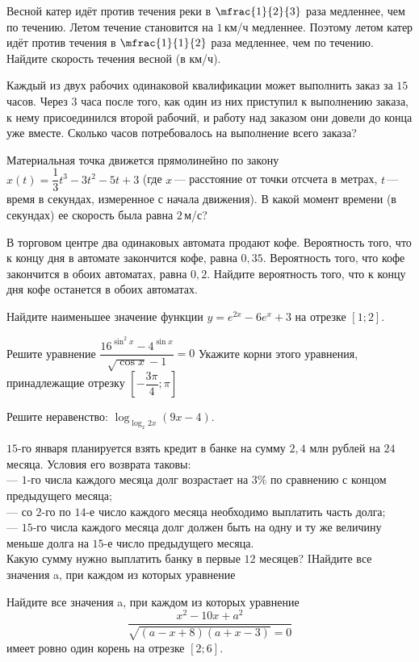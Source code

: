 \begin{class}[number=3]
	\begin{listofex}
		\item Весной катер идёт против течения реки в \(\mfrac{1 }{2 }{ 3}\) раза медленнее, чем по течению. Летом течение становится на \(1\) км/ч медленнее. Поэтому летом катер идёт против течения в \(\mfrac{1 }{1 }{2 }\) раза медленнее, чем по течению. Найдите скорость течения весной (в км/ч).
		\item Каждый из двух рабочих одинаковой квалификации может выполнить заказ за \(15\) часов. Через \(3\) часа после того, как один из них приступил к выполнению заказа, к нему присоединился второй рабочий, и работу над заказом они довели до конца уже вместе. Сколько часов потребовалось на выполнение всего заказа?
		\item Материальная точка движется прямолинейно по закону \(x(t)=\dfrac{ 1 }{ 3 }t^3-3t^2-5t+3\) (где \(x\) --- расстояние от точки отсчета в метрах, \(t\) --- время в секундах, измеренное с начала движения). В какой момент времени (в секундах) ее скорость была равна \(2\) м/с?
		\item В торговом центре два одинаковых автомата продают кофе. Вероятность того, что к концу дня в автомате закончится кофе, равна \(0,35\). Вероятность того, что кофе закончится в обоих автоматах, равна \(0,2\). Найдите вероятность того, что к концу дня кофе останется в обоих автоматах.
		\item Найдите наименьшее значение функции \(y=e^{2x}-6e^x+3\) на отрезке \([1;2]\).
		\item 
		\begin{tasks}
			\task Решите уравнение \( \dfrac{ 16^{\sin^2x}-4^{\sin x} }{ \sqrt{\cos x}-1 }=0 \)
			\task Укажите корни этого уравнения, принадлежащие отрезку \(\left[ -\dfrac{ 3\pi }{ 4 }; \pi \right] \)
		\end{tasks}
		\item Решите неравенство: \(\log_{\log_x 2x}(9x-4) \).
		\item \(15\)-го января планируется взять кредит в банке на сумму \(2,4\) млн рублей на \(24\) месяца. Условия его возврата таковы: \\
		--- \(1\)-го числа каждого месяца долг возрастает на \(3\%\) по сравнению с концом предыдущего месяца; \\
		--- со \(2\)-го по \(14\)-е число каждого месяца необходимо выплатить часть долга; \\
		--- \(15\)-го числа каждого месяца долг должен быть на одну и ту же величину меньше долга на \(15\)-е число предыдущего месяца. \\
		Какую сумму нужно выплатить банку в первые \(12\) месяцев?
		IНайдите все значения a, при каждом из которых уравнение
		
		\item Найдите все значения a, при каждом из которых уравнение
		\[\dfrac{ x^2-10x+a^2 }{ \sqrt{(a-x+8)(a+x-3)}=0 }\]
		имеет ровно один корень на отрезке \([2; 6]\).
	\end{listofex}
\end{class}

